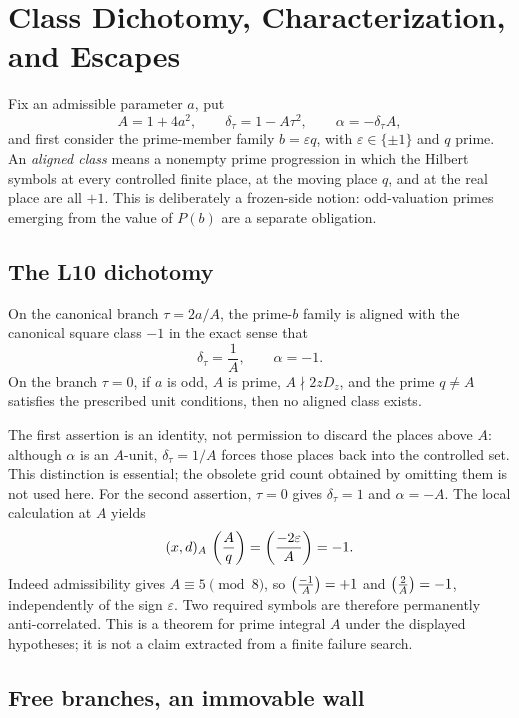 \section{Class Dichotomy, Characterization, and Escapes}
\label{sec:classes}

Fix an admissible parameter $a$, put
\[
 A=1+4a^2,\qquad \delta_\tau=1-A\tau^2,
 \qquad \alpha=-\delta_\tau A,
\]
and first consider the prime-member family $b=\varepsilon q$, with
$\varepsilon\in\{\pm1\}$ and $q$ prime.  An \emph{aligned class} means a
nonempty prime progression in which the Hilbert symbols at every controlled
finite place, at the moving place $q$, and at the real place are all $+1$.
This is deliberately a frozen-side notion: odd-valuation primes emerging from
the value of $P(b)$ are a separate obligation.

\subsection{The L10 dichotomy}

\begin{proposition}
On the canonical branch $\tau=2a/A$, the prime-$b$ family is aligned with the
canonical square class $-1$ in the exact sense that
\[
 \delta_\tau=\frac1A,\qquad \alpha=-1.
\]
On the branch $\tau=0$, if $a$ is odd, $A$ is prime,
$A\nmid 2zD_z$, and the prime $q\ne A$ satisfies the prescribed unit
conditions, then no aligned class exists.
\end{proposition}

The first assertion is an identity, not permission to discard the places
above $A$: although $\alpha$ is an $A$-unit, $\delta_\tau=1/A$ forces those
places back into the controlled set.  This distinction is essential; the
obsolete grid count obtained by omitting them is not used here.  For the
second assertion, $\tau=0$ gives $\delta_\tau=1$ and $\alpha=-A$.  The local
calculation at $A$ yields
\[
 (x,d)_A\,\left(\frac{A}{q}\right)=\left(\frac{-2\varepsilon}{A}\right)=-1.
\]
Indeed admissibility gives $A\equiv5\pmod 8$, so
$\left(\frac{-1}{A}\right)=+1$ and $\left(\frac{2}{A}\right)=-1$, independently of the sign
$\varepsilon$.  Two required symbols are therefore permanently
anti-correlated.  This is a theorem for prime integral $A$ under the displayed
hypotheses; it is not a claim extracted from a finite failure search.

\subsection{Free branches, an immovable wall}

